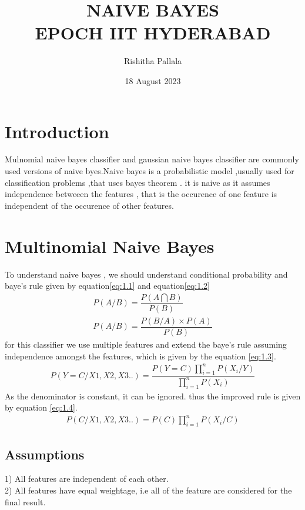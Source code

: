 \documentclass{article}
\title{\textbf{NAIVE BAYES}\\EPOCH IIT HYDERABAD}
\author{Rishitha Pallala }
\date{18 August 2023}
\begin{document}
\maketitle
\section{Introduction}
  Mulnomial naive bayes classifier and gaussian naive bayes classifier are commonly used versions of naive byes.Naive bayes is a probabilistic model ,usually used for classification problems ,that uses bayes theorem . it is naive as it assumes independence betweeen the features , that is the occurence of one feature is independent of the occurence of other features. 
  \section{Multinomial Naive Bayes}
   To understand naive bayes , we should understand conditional probability and baye's rule given by equation\eqref{eq:1.1} and equation\eqref{eq:1.2}
   \begin{align}
       P(A/B)=\dfrac{P(A\bigcap B)}{P(B)}\label{eq:1.1}\\
       P(A/B)=\dfrac{P(B/A)\times P(A)}{P(B)}\label{eq:1.2}
   \end{align}
   for this classifier we use multiple features and extend the baye's rule assuming independence amongst the features, which is given by the equation \eqref{eq:1.3}.
   \begin{align}
       P(Y=C/X1,X2,X3..)=\dfrac{P(Y=C)\prod_{i=1}^nP(X_i/Y)}{\prod_{i=1}^nP(X_i)}\label{eq:1.3}
   \end{align}
   As the denominator is constant, it can be ignored. thus the improved rule is given by equation \eqref{eq:1.4}.
    \begin{align}
       P(C/X1,X2,X3..)={P(C)\prod_{i=1}^nP(X_i/C)}\label{eq:1.4}
   \end{align}
   \subsection{Assumptions}
   1) All features are independent of each other.\\
   2) All features have equal weightage, i.e all of the feature are considered for the final result.
\end{document}
